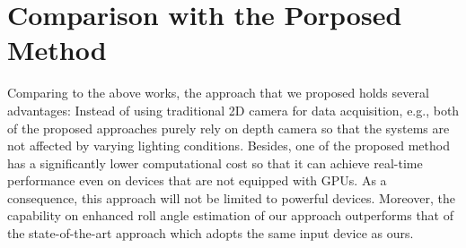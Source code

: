 \section{Comparison with the Porposed Method}
Comparing to the above works, the approach that we proposed holds several advantages: Instead of using traditional 2D camera for data acquisition, e.g.\cite{Murphy:09:SURVEY}, both of the proposed approaches purely rely on depth camera so that the systems are not affected by varying lighting conditions. Besides, one of the proposed method has a significantly lower computational cost so that it can achieve real-time performance even on devices that are not equipped with GPUs. As a consequence, this approach will not be limited to powerful devices. Moreover, the capability on enhanced roll angle estimation of our approach outperforms that of the state-of-the-art approach\cite{Fanelli:11:RTHPEWRRF,fanelli_DAGM11} which adopts the same input device as ours.


